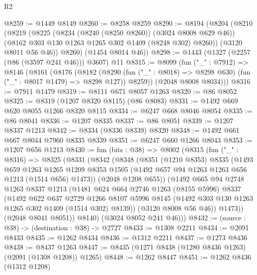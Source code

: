 \begin{lexlean}{R2}
\begin{coremodule}
@8259 := @1449 @8149
@8260 := @8258 @8259
@8290 := @8194
    (@8204
      (@8210
        (@8219
          (@8225
            (@8234 (@8240 (@8250 @8260)) (@3024 @8008 @629 @46))
            (@8162 @303 @130 @1263 @1265 @302 @1409 (@8248 @302) @8260))
          (@3120 @8011 @56 @46))
        @8260)
      (@1454 @8014 @46))
@8298 := @1443 (@1327 (@2257 (@86 (@3597 @241 @46))) @3607) @11
@8315 := @8099
    (fun ("_" : @7912) =>
    @8146
      (@8161
        (@8176
          (@8182
            (@8290 (fun ("_" : @8018) => @8298 @630) (fun ("_" : @8017 @1479) => @8298 @127))
            @8259))
        (@2048 @8008 @8034)))
@8316 := @7911 @1479
@8319 := @8111 @671 @8057 @1263
@8320 := @86 @8052
@8325 := @8319 (@1207 @8320 @8115) (@86 @8083)
@8331 := @1492 @669 @620 @8055 @1266 @8320 @8115
@8334 := @6247 @668 @8046 @8054
@8335 := @86 @8041
@8336 := @1207 @8335
@8337 := @86 @8051
@8339 := @1207 @8337 @1213
@8342 := @8334 (@8336 @8339) @8320
@8348 := @1492 @661 @667 @8044 @7960 @8335 @8339
@8351 := @6247 @660 @1266 @8043
@8353 := @1207 @656 @1213
@8430 := fun (bits : @38) =>
  @8002
    (@8315
      (fun ("_" : @8316) =>
      @8325
        (@8331
          (@8342
            (@8348
              (@8351
                (@1210 @8353)
                @8335
                (@1493
                  @659
                  @1263
                  @1265
                  @1209
                  @8353
                  @1505
                  (@1492 @657 @94 @1263 @1263 @656 @1213 (@1514 @656) @1473))
                (@2048 @1208 @655))
              (@1492
                @665
                @94
                @2748
                @1263
                @8337
                @1213
                (@1481
                  @624
                  @664
                  @2746
                  @1263
                  (@8155 @5996)
                  @8337
                  (@1492
                    @622
                    @637
                    @2729
                    @1266
                    @8107
                    @5996
                    @8145
                    (@1492 @303 @130 @1263 @1265 @302 @1409 (@1514 @302) @8139))
                  (@3120 @8008 @56 @46))
                @1473))
            (@2048 @8041 @8051))
          @8140)
        (@3024 @8052 @241 @46)))
@8432 := (source : @38) -> (destination : @38) -> @2727
@8433 := @1308 @2211
@8434 := @2091 @8433
@8435 := @1262 @8434
@8436 := @1312 @2211
@8437 := @1273 @8436
@8438 := @8437 @1263
@8447 := @8435 (@1271 @8438 (@1280 @8436 @1263) (@2091 (@1308 @1208)) @1265)
@8448 := @1262 @8447
@8451 := @1262 @8436 (@1312 @1208)

\end{coremodule}
\end{lexlean}
